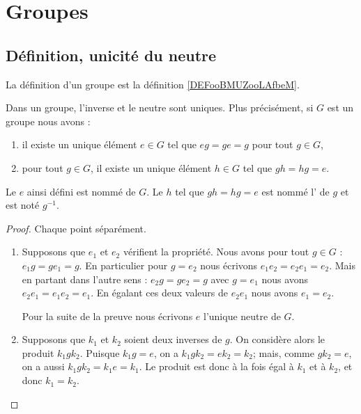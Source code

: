 \section{Groupes}

\subsection{Définition, unicité du neutre}

La définition d'un groupe est la définition \ref{DEFooBMUZooLAfbeM}.

\begin{lemmaDef}[Unicités]  \label{LEMooECDMooCkWxXf}
    Dans un groupe, l'inverse et le neutre sont uniques. Plus précisément, si \( G\) est un groupe nous avons :
    \begin{enumerate}
        \item
            il existe un unique élément \( e\in G\) tel que \( e g=g e=g\) pour tout \( g\in G\),
        \item       \label{ITEMooOIWTooYqmMPP}
            pour tout \( g\in G\), il existe un unique élément \( h\in  G\) tel que \(g h=h g=e \).
    \end{enumerate}
    Le \( e\) ainsi défini est nommé  de \( G\). Le \( h\) tel que \( g h=h g=e\) est nommé l' de \( g\) et est noté \( g^{-1}\).
\end{lemmaDef}

\begin{proof}
    Chaque point séparément.
    \begin{enumerate}
        \item
            Supposons que \( e_1\) et \( e_2\) vérifient la propriété. Nous avons pour tout \( g\in G\) : \( e_1g=ge_1=g\). En particulier pour \( g=e_2\) nous écrivons \( e_1e_2=e_2e_1=e_2\). Mais en partant dans l'autre sens : \( e_2g=ge_2=g\) avec \( g=e_1\) nous avons \( e_2e_1=e_1e_2=e_1\). En égalant ces deux valeurs de \( e_2e_1\) nous avons \( e_1=e_2\).

            Pour la suite de la preuve nous écrivons \( e\) l'unique neutre de \( G\).

        \item
            Supposons que \( k_1\) et \( k_2\) soient deux inverses de \( g\). On considère alors le produit \( k_1 g k_2 \). Puisque \(k_1 g = e \), on a \( k_1 g k_2 = e k_2 = k_2 \); mais, comme \(g k_2 = e \), on a aussi \( k_1 g k_2 = k_1 e = k_1 \). Le produit est donc à la fois égal à \( k_1 \) et à \( k_2 \), et donc \( k_1 = k_2 \).
    \end{enumerate}
\end{proof}

